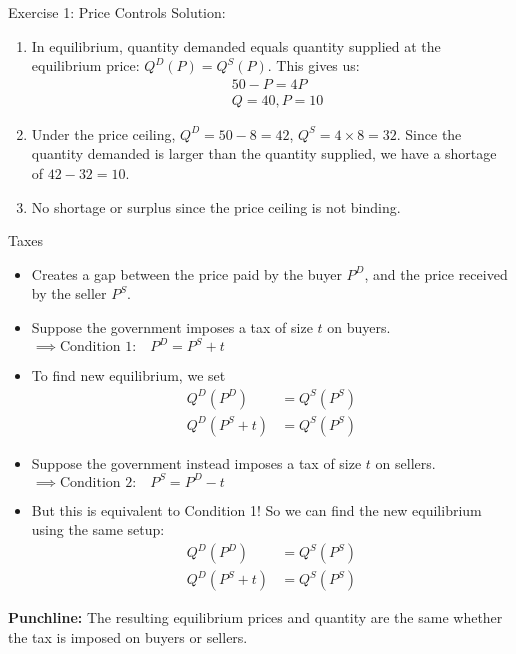 \documentclass[9pt, handout]{beamer}
\begin{document}
\begin{frame}{Exercise 1: Price Controls}
    Solution: 
    \begin{enumerate}
        \item In equilibrium, quantity demanded equals quantity supplied at the equilibrium price: $Q^D(P)=Q^S(P)$. This gives us: 
        \begin{align*}
            & 50 - P = 4P \\
            & Q = 40, P = 10
        \end{align*}
        \item Under the price ceiling, $Q^D = 50 - 8 =42$, $Q^S=4\times 8 = 32$. Since the quantity demanded is larger than the quantity supplied, we have a shortage of $42-32=10$. 
        \item No shortage or surplus since the price ceiling is not binding. 
    \end{enumerate}
\end{frame}

\begin{frame}{Taxes}
    \begin{itemize}
        \item Creates a gap between the price paid by the buyer $P^D$, and the price received by the seller $P^S$.
        \item Suppose the government imposes a tax of size $t$ on buyers.\\
        $\implies \text{Condition 1:} \quad P^D = P^S + t$
        \item To find new equilibrium, we set
        \begin{align*}
            Q^D(P^D) &= Q^S(P^S)\\
            Q^D(P^S + t) &= Q^S(P^S)
        \end{align*}
        \item Suppose the government instead imposes a tax of size $t$ on sellers.\\
        $\implies \text{Condition 2:} \quad P^S = P^D - t$
        \item But this is equivalent to Condition 1!  So we can find the new equilibrium using the same setup:
        \begin{align*}
            Q^D(P^D) &= Q^S(P^S)\\
            Q^D(P^S + t) &= Q^S(P^S)
        \end{align*}
    \end{itemize}
    \textbf{Punchline:} The resulting equilibrium prices and quantity are the same whether the tax is imposed on buyers or sellers.
\end{frame}
\end{document}
